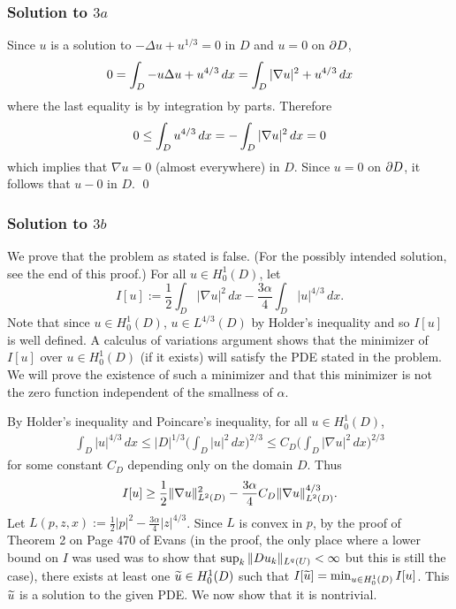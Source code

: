 \subsubsection*{Solution to $3a$}
Since $u$ is a solution to $-\Delta u + u^{1/3} = 0$ in $D$ and $u = 0$ on $\partial D$,
\begin{align*}
0 = \int_{D}-u\Delta u + u^{4/3}\, dx = \int_{D}|\nabla u|^{2} + u^{4/3}\, dx
\end{align*}
where the last equality is by integration by parts.
Therefore
\begin{align*}
0 \leq \int_{D}u^{4/3}\, dx = -\int_{D}|\nabla u|^{2}\, dx = 0
\end{align*}
which implies that $\nabla u = 0$ (almost everywhere) in $D$. Since $u = 0$ on $\partial D$,
it follows that $u - 0$ in $D$.
\hfill\qed

\subsubsection*{Solution to $3b$}
We prove that the problem as stated is false. (For the possibly intended solution, see the end of this proof.)
For all $u \in H_{0}^{1}(D)$, let
$$I[u] := \frac{1}{2}\int_{D}|\nabla u|^{2}\, dx - \frac{3\alpha}{4}\int_{D}|u|^{4/3}\, dx.$$
Note that since $u \in H_{0}^{1}(D)$, $u \in L^{4/3}(D)$ by Holder's inequality and so $I[u]$ is well defined.
A calculus of variations argument shows that the minimizer of $I[u]$ over $u \in H_{0}^{1}(D)$ (if it exists)
will satisfy the PDE stated in the problem. We will prove the existence of such a minimizer and
that this minimizer is not the zero function independent of the smallness of $\alpha$.

By Holder's inequality and Poincare's inequality, for all $u \in H_{0}^{1}(D)$,
\begin{align*}
\int_{D}|u|^{4/3}\, dx \leq |D|^{1/3}\bigg(\int_{D}|u|^{2}\, dx\bigg)^{2/3} \leq C_{D}\bigg(\int_{D}|\nabla u|^{2}\, dx\bigg)^{2/3}
\end{align*}
for some constant $C_{D}$ depending only on the domain $D$. Thus
$$I[u] \geq \frac{1}{2}\| \nabla u \|_{L^{2}(D)}^{2} - \frac{3\alpha}{4}C_{D}\| \nabla u \|_{L^{2}(D)}^{4/3}.$$
Let $L(p, z, x) := \frac{1}{2}|p|^{2} - \frac{3\alpha}{4}|z|^{4/3}$. Since $L$ is convex in $p$,
by the proof of Theorem 2 on Page 470 of Evans (in the proof, the only place where a lower bound on $I$ was used was to show that $\sup_{k}\| Du_{k} \|_{L^{q}(U)} < \infty$ but this is still the case),
there exists at least one $\widetilde{u} \in H_{0}^{1}(D)$ such that $I[\widetilde{u}] = \min_{u \in H_{0}^{1}(D)}I[u]$.
This $\widetilde{u}$ is a solution to the given PDE. We now show that it is nontrivial.

